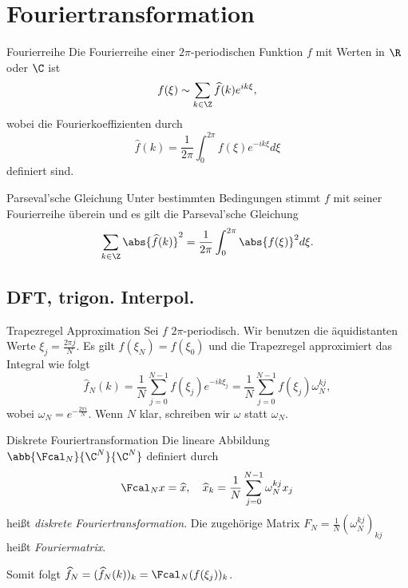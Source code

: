 \section{Fouriertransformation}

\begin{karte}{Fourierreihe}
    Die Fourierreihe einer \( 2\pi \)-periodischen Funktion \(f\) 
    mit Werten in \(\R\) oder \(\C\) ist 
    \[ f(\xi) \sim \sum_{k\in\Z} \widehat{f}(k) e^{ik\xi}, \]
    wobei die Fourierkoeffizienten durch 
    \[ \widehat{f}(k) = \frac{1}{2\pi} \int_0^{2\pi} f(\xi) e^{-ik\xi} d\xi \]
    definiert sind.
\end{karte}

\begin{karte}{Parseval'sche Gleichung}
    Unter bestimmten Bedingungen stimmt \(f\) mit seiner Fourierreihe überein 
    und es gilt die Parseval'sche Gleichung
    \[ \sum_{k\in\Z} \abs{\widehat{f}(k)}^2 = \frac{1}{2\pi} \int_0^{2\pi} \abs{f(\xi)}^2 d\xi. \]
\end{karte}

\subsection{DFT, trigon. Interpol.}

\begin{karte}{Trapezregel Approximation}
    Sei \(f\) \(2\pi\)-periodisch. Wir benutzen die äquidistanten Werte 
    \( \xi_j = \frac{2\pi j}{N} \). Es gilt \( f(\xi_N) = f(\xi_0) \)
    und die Trapezregel approximiert das Integral wie folgt 
    \[ \widehat{f}_N(k) = \frac{1}{N} \sum_{j=0}^{N-1} f(\xi_j) e^{-ik\xi_j} 
    = \frac{1}{N} \sum_{j=0}^{N-1} f(\xi_j) \omega_N^{kj}, \]
    wobei \( \omega_N = e^{-\frac{2\pi i}{N}} \). Wenn \(N\) klar, 
    schreiben wir \(\omega\) statt \(\omega_N\). 
\end{karte}

\begin{karte}{Diskrete Fouriertransformation}
    Die lineare Abbildung \( \abb{\Fcal_N}{\C^N}{\C^N} \)
    definiert durch 
    \[ \Fcal_N x = \widehat{x}, \quad 
    \widehat{x}_k = \frac{1}{N} \sum_{j=0}^{N-1} \omega_N^{kj} x_j \]
    heißt \textit{diskrete Fouriertransformation}. 
    Die zugehörige Matrix \( F_N = \frac{1}{N} (\omega_N^{kj})_{kj} \) 
    heißt \textit{Fouriermatrix}.

    Somit folgt \( \widehat{f}_N = (\widehat{f}_N(k))_k = \Fcal_N(f(\xi_j))_k \).
\end{karte}

